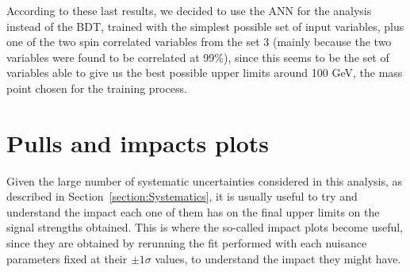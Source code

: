 \documentclass[a4paper, 10pt, openright]{report}
\begin{document}
\begin{appendices}
According to these last results, we decided to use the \ac{ANN} for the analysis instead of the \ac{BDT}, trained with the simplest possible set of input variables, plus one of the two spin correlated variables from the set 3 (mainly because the two variables were found to be correlated at 99\%), since this seems to be the set of variables able to give us the best possible upper limits around 100 GeV, the mass point chosen for the training process. 

\chapter{Pulls and impacts plots} \label{appendix:Impact}

Given the large number of systematic uncertainties considered in this analysis, as described in Section~\ref{section:Systematics}, it is usually useful to try and understand the impact each one of them has on the final upper limits on the signal strengths obtained. This is where the so-called impact plots become useful, since they are obtained by rerunning the fit performed with each nuisance parameters fixed at their $\pm 1 \sigma$ values, to understand the impact they might have.

\end{appendices}

\listoffigures 

\listoftables

































\end{document}
